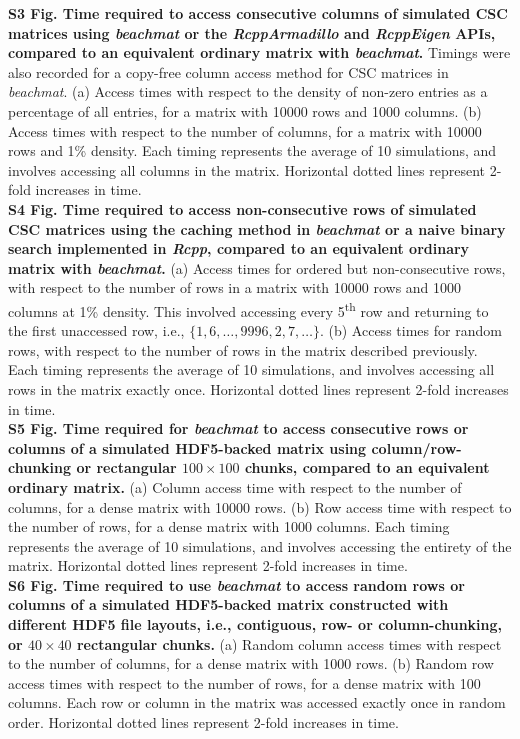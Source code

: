 \documentclass[10pt,letterpaper]{article}
\newcommand{\beachmat}{\textit{beachmat}}
\begin{document}
\noindent
\textbf{S3 Fig. Time required to access consecutive columns of simulated CSC matrices using \beachmat{} or the \textit{RcppArmadillo} and \textit{RcppEigen} APIs, compared to an equivalent ordinary matrix with \beachmat{}.}
Timings were also recorded for a copy-free column access method for CSC matrices in \beachmat{}.
(a) Access times with respect to the density of non-zero entries as a percentage of all entries, for a matrix with 10000 rows and 1000 columns.
(b) Access times with respect to the number of columns, for a matrix with 10000 rows and 1\% density.
Each timing represents the average of 10 simulations, and involves accessing all columns in the matrix.
Horizontal dotted lines represent 2-fold increases in time.
\\[0.05in]

\noindent
\textbf{S4 Fig. Time required to access non-consecutive rows of simulated CSC matrices using the caching method in \beachmat{} or a naive binary search implemented in \textit{Rcpp}, compared to an equivalent ordinary matrix with \beachmat{}.}
(a) Access times for ordered but non-consecutive rows, with respect to the number of rows in a matrix with 10000 rows and 1000 columns at 1\% density.
This involved accessing every 5\textsuperscript{th} row and returning to the first unaccessed row, i.e., $\{1, 6, \ldots, 9996, 2, 7, \ldots\}$.
(b) Access times for random rows, with respect to the number of rows in the matrix described previously.
Each timing represents the average of 10 simulations, and involves accessing all rows in the matrix exactly once.
Horizontal dotted lines represent 2-fold increases in time.
\\[0.05in]

\noindent
\textbf{S5 Fig. Time required for \beachmat{} to access consecutive rows or columns of a simulated HDF5-backed matrix using column/row-chunking or rectangular $100\times100$ chunks, compared to an equivalent ordinary matrix.}
(a) Column access time with respect to the number of columns, for a dense matrix with 10000 rows.
(b) Row access time with respect to the number of rows, for a dense matrix with 1000 columns.
Each timing represents the average of 10 simulations, and involves accessing the entirety of the matrix.
Horizontal dotted lines represent 2-fold increases in time.
\\[0.05in]

\noindent
\textbf{S6 Fig. Time required to use \beachmat{} to access random rows or columns of a simulated HDF5-backed matrix constructed with different HDF5 file layouts, 
i.e., contiguous, row- or column-chunking, or $40\times40$ rectangular chunks.}
(a) Random column access times with respect to the number of columns, for a dense matrix with 1000 rows.
(b) Random row access times with respect to the number of rows, for a dense matrix with 100 columns.
Each row or column in the matrix was accessed exactly once in random order.
Horizontal dotted lines represent 2-fold increases in time.
\\[0.05in]
\end{document}
